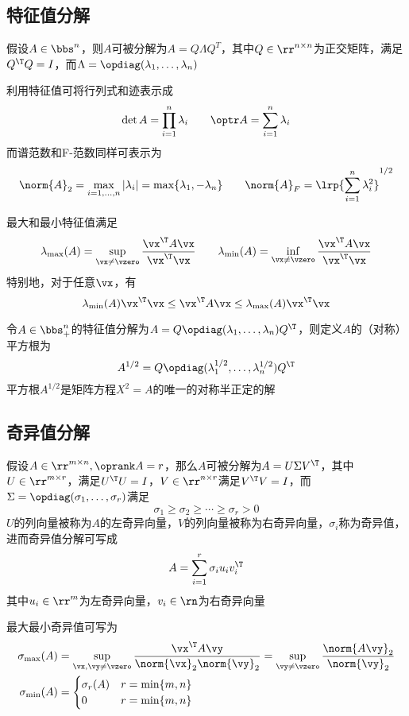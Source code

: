 \subsection{特征值分解}
\begin{definition}
假设$A\in\bbs^n$，则$A$可被分解为$A=Q\Lambda Q^T$，其中$Q\in\rr^{n\times n}$为正交矩阵，满足$Q^\T Q=I$，而$\Lambda=\opdiag(\lambda_1,\ldots,\lambda_n)$
\end{definition}

利用特征值可将行列式和迹表示成
\[\det A=\prod_{i=1}^n\lambda_i\qquad\optr A=\sum_{i=1}^n\lambda_i\]
而谱范数和F-范数同样可表示为
\[\norm{A}_2=\max_{i=1,\ldots,n}|\lambda_i|=\max\{\lambda_1,-\lambda_n\}\qquad\norm{A}_F=\lrp{\sum_{i=1}^n\lambda_i^2}^{1/2}\]

最大和最小特征值满足
\[\lambda_{\max}(A)=\sup_{\vx\ne\vzero}\frac{\vx^\T A\vx}{\vx^\T\vx}\qquad\lambda_{\min}(A)=\inf_{\vx\ne\vzero}\frac{\vx^\T A\vx}{\vx^\T\vx}\]
特别地，对于任意$\vx$，有
\[\lambda_{\min}(A)\vx^\T\vx\leq\vx^\T A\vx\leq\lambda_{\max}(A)\vx^\T\vx\]

令$A\in\bbs_+^n$的特征值分解为$A=Q\opdiag(\lambda_1,\ldots,\lambda_n)Q^\T$，则定义$A$的（对称）平方根为
\[A^{1/2}=Q\opdiag(\lambda_1^{1/2},\ldots,\lambda_n^{1/2})Q^\T\]
平方根$A^{1/2}$是矩阵方程$X^2=A$的唯一的对称半正定的解

\subsection{奇异值分解}
\begin{definition}
    假设$A\in\rr^{m\times n},\oprank A=r$，那么$A$可被分解为$A=U\Sigma V^\T$，其中$U\in\rr^{m\times r}$，满足$U^\T U=I$，$V\in\rr^{n\times r}$满足$V^\T V=I$，而$\Sigma=\opdiag(\sigma_1,\ldots,\sigma_r)$满足
    \[\sigma_1\geq\sigma_2\geq\cdots\geq\sigma_r>0\]
    $U$的列向量被称为$A$的左奇异向量，$V$的列向量被称为右奇异向量，$\sigma_i$称为奇异值，进而奇异值分解可写成
    \[A=\sum_{i=1}^r\sigma_i u_i v_i^\T\]
    其中$u_i\in\rr^m$为左奇异向量，$v_i\in\rn$为右奇异向量
\end{definition}

最大最小奇异值可写为
\[\begin{aligned}
    \sigma_{\max}(A)&=\sup_{\vx,\vy\ne\vzero}\frac{\vx^\T A\vy}{\norm{\vx}_2\norm{\vy}_2}=\sup_{\vy\ne \vzero}\frac{\norm{A\vy}_2}{\norm{\vy}_2}\\
    \sigma_{\min}(A)&=\begin{cases}
        \sigma_r(A) & r=\min\{m,n\}\\
        0 & r=\min\{m,n\}
    \end{cases}
\end{aligned}\]

